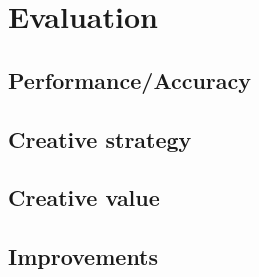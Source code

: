
\chapter{Evaluation} %

\label{Chapter7} %


\section{Performance/Accuracy}


\section{Creative strategy}


\section{Creative value}


\section{Improvements}

